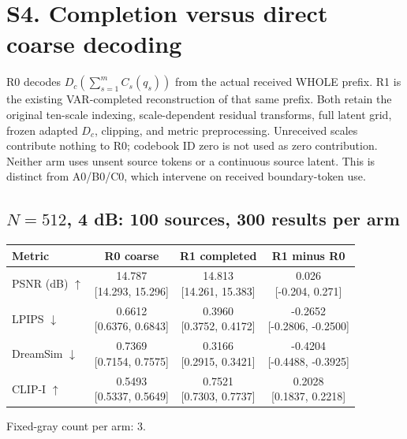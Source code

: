 \documentclass[11pt,letterpaper]{article}
\newcommand{\Dc}{D_c}
\begin{document}
\clearpage\section*{S4. Completion versus direct coarse decoding}
R0 decodes $\Dc(\sum_{s=1}^{m}C_s(q_s))$ from the actual received WHOLE prefix. R1 is the existing VAR-completed reconstruction of that same prefix. Both retain the original ten-scale indexing, scale-dependent residual transforms, full latent grid, frozen adapted $\Dc$, clipping, and metric preprocessing. Unreceived scales contribute nothing to R0; codebook ID zero is not used as zero contribution. Neither arm uses unsent source tokens or a continuous source latent. This is distinct from A0/B0/C0, which intervene on received boundary-token use.

\subsection*{$N=512$, 4 dB: 100 sources, 300 results per arm}
\begin{center}\small\setlength{\tabcolsep}{7pt}\renewcommand{\arraystretch}{1.55}
\begin{tabular}{lccc}
\toprule
Metric & R0 coarse & R1 completed & R1 minus R0\\\midrule
PSNR (dB) $\uparrow$ & \shortstack{14.787\\{}[14.293, 15.296]} & \shortstack{14.813\\{}[14.261, 15.383]} & \shortstack{0.026\\{}[-0.204, 0.271]}\\
LPIPS $\downarrow$ & \shortstack{0.6612\\{}[0.6376, 0.6843]} & \shortstack{0.3960\\{}[0.3752, 0.4172]} & \shortstack{-0.2652\\{}[-0.2806, -0.2500]}\\
DreamSim $\downarrow$ & \shortstack{0.7369\\{}[0.7154, 0.7575]} & \shortstack{0.3166\\{}[0.2915, 0.3421]} & \shortstack{-0.4204\\{}[-0.4488, -0.3925]}\\
CLIP-I $\uparrow$ & \shortstack{0.5493\\{}[0.5337, 0.5649]} & \shortstack{0.7521\\{}[0.7303, 0.7737]} & \shortstack{0.2028\\{}[0.1837, 0.2218]}\\
\bottomrule\end{tabular}\end{center}
Fixed-gray count per arm: 3.
\end{document}
